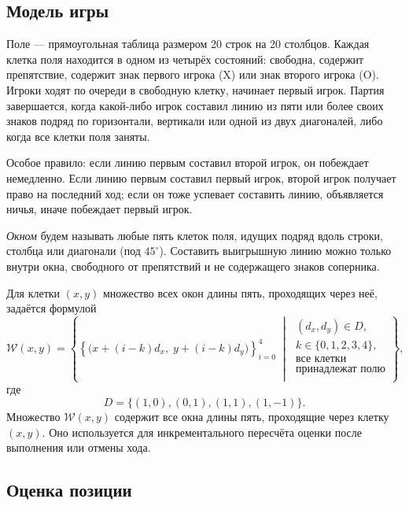 \documentclass[14pt,a4paper]{extarticle}
\begin{document}
	\subsection{Модель игры}
	
	Поле --- прямоугольная таблица размером 20 строк на 20 столбцов. Каждая клетка поля находится в одном из четырёх состояний: свободна, содержит препятствие, содержит знак первого игрока (X) или знак второго игрока (O). Игроки ходят по очереди в свободную клетку, начинает первый игрок. Партия завершается, когда какой-либо игрок составил линию из пяти или более своих знаков подряд по горизонтали, вертикали или одной из двух диагоналей, либо когда все клетки поля заняты.
	
	Особое правило: если линию первым составил второй игрок, он побеждает немедленно. Если линию первым составил первый игрок, второй игрок получает право на последний ход; если он тоже успевает составить линию, объявляется ничья, иначе побеждает первый игрок.
	
	\emph{Окном} будем называть любые пять клеток поля, идущих подряд вдоль строки, столбца или диагонали (под $45^\circ$). Составить выигрышную линию можно только внутри окна, свободного от препятствий и не содержащего знаков соперника.
	
	Для клетки $(x,y)$ множество всех окон длины пять, проходящих через неё, задаётся формулой
	\begin{equation}\label{eq:windows}
		\mathcal{W}(x,y)=\left\{
		\left\{\bigl(x+(i-k)d_x,\;y+(i-k)d_y\bigr)\right\}_{i=0}^{4}
		\;\middle|\;
		\begin{gathered}
			(d_x,d_y)\in D,\\
			k\in\{0,1,2,3,4\},\\
			\text{все клетки} \\
				\text{принадлежат полю} \\
		\end{gathered}
		\right\},
	\end{equation}
	где
	\begin{equation*}
		D=\{(1,0),(0,1),(1,1),(1,-1)\}.
	\end{equation*}
	Множество $\mathcal{W}(x,y)$ содержит все окна длины пять, проходящие через клетку $(x,y)$. Оно используется для инкрементального пересчёта оценки после выполнения или отмены хода.
	
	\subsection{Оценка позиции}
	
\end{document}
